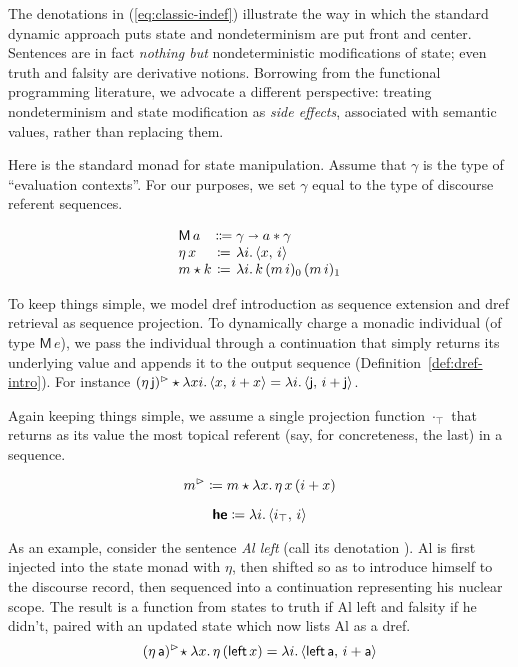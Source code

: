   The denotations in (\ref{eq:classic-indef}) illustrate the way in which the standard dynamic approach puts state and nondeterminism are put front and center. Sentences are in fact \emph{nothing but} nondeterministic modifications of state; even truth and falsity are derivative notions. Borrowing from the functional programming literature, we advocate a different perspective: treating nondeterminism and state modification as \emph{side effects}, associated with semantic values, rather than replacing them. 
	
  Here is the standard monad for state manipulation. Assume that $\gamma$ is the type of ``evaluation contexts''. For our purposes, we set $\gamma$ equal to the type of discourse referent sequences.%
	\begin{defi}\label{state}
		\[\begin{array}[t]
			{@{}l@{}c@{}l@{}}
			\textsf{M}\,a &{}\Coloneqq{} &\gamma \ra a \ast \gamma	%
			\\
			\eta\,x &{}\ceq{} &\lambda i.\,\ab{x,\,i}
			\\
			m \star k &{}\ceq{} &\lambda i.\,k\,(m\,i)_0\,(m\,i)_1%
		\end{array}\]
	\end{defi}
	
  To keep things simple, we model dref introduction as sequence extension \citep[cf.][]{Groote:2006, Unger:2012, Charlow:diss} and dref retrieval as sequence projection. To dynamically charge a monadic individual (of type $\textsf{M}\,e$), we pass the individual through a continuation that simply returns its underlying value and appends it to the output sequence (Definition~\ref{def:dref-intro}). For instance $(\eta\,\textsf{j})^\rhd \star \lambda xi.\,\langle x,\,i+x \rangle = \lambda i.\,\langle \textsf{j},\,i+\textsf{j} \rangle$.
  
  Again keeping things simple, we assume a single projection function $\cdot_\top$ that returns as its value the most topical referent (say, for concreteness, the last) in a sequence.
	\begin{defi}
    \label{def:dref-intro}%
    \[m^\rhd \coloneqq m \star \lambda x.\,\eta\,x\,(i+x)\]
	\end{defi}
	\begin{defi}
		\[\textbf{\textsf{he}} \coloneqq \lambda i.\,\langle i_\top,\,i \rangle\]
	\end{defi}
	
\noindent
As an example, consider the sentence \emph{Al left} (call its denotation ). Al is first injected into the state monad with $\eta$, then shifted so as to introduce himself to the discourse record, then sequenced into a continuation representing his nuclear scope. The result is a function from states to truth if Al left and falsity if he didn't, paired with an updated state which now lists Al as a dref.
	\[(\eta\,\textsf{a})^\rhd\! \star \lambda x.\,\eta\,(\textsf{left}\,x) = \lambda i.\,\langle \textsf{left}\,\textsf{a},\,i+\textsf{a} \rangle\]%
	
